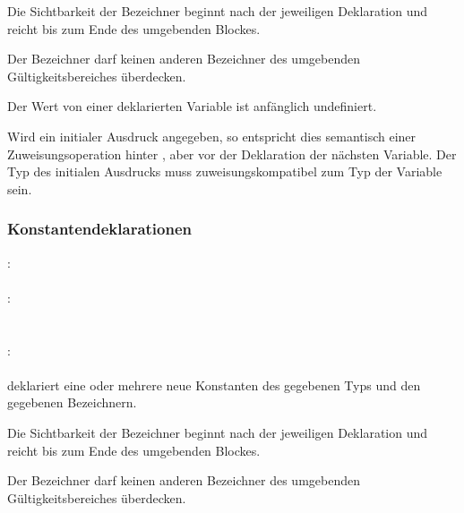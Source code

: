 Die Sichtbarkeit der Bezeichner beginnt nach der jeweiligen Deklaration
und reicht bis zum Ende des umgebenden Blockes.

Der Bezeichner darf keinen anderen Bezeichner des umgebenden Gültigkeitsbereiches überdecken.

Der Wert von einer deklarierten Variable ist anfänglich undefiniert.

Wird ein initialer Ausdruck angegeben, so entspricht dies semantisch einer Zuweisungsoperation
hinter , aber vor der Deklaration der nächsten Variable.
Der Typ des initialen Ausdrucks muss zuweisungskompatibel zum Typ der Variable sein.

\subsubsection{Konstantendeklarationen}\label{Konstantendeklarationen}
:\label{dekl_konst}\\
\hspace*{1cm}\glq{}\grq  {}   \\
:\label{dekl_konst_bzch_init_liste}\\
\hspace*{1cm} \\
\hspace*{1cm} \glq\Gt{,}\grq  {} \\
:\label{dekl_konst_bzch_init}\\
\hspace*{1cm}  \glq\Gt{=}\grq  {} \\

 deklariert eine oder mehrere neue Konstanten des gegebenen Typs und den gegebenen Bezeichnern.

Die Sichtbarkeit der Bezeichner beginnt nach der jeweiligen Deklaration
und reicht bis zum Ende des umgebenden Blockes.

Der Bezeichner darf keinen anderen Bezeichner des umgebenden Gültigkeitsbereiches überdecken.

